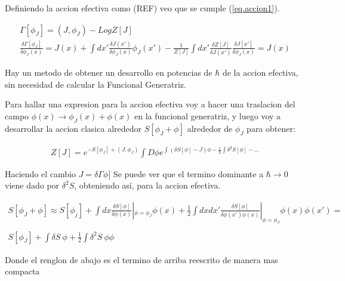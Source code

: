 Definiendo la accion efectiva como (REF) veo que se cumple (\ref{eq.accion1}).

\begin{equation}
\begin{array}{c}
\Gamma [\phi _J] = (J, \phi _J) - Log Z [J] \\
\frac{\delta \Gamma [ \phi _J ]}{\delta \phi _J (x) } = 
J(x) + \int dx ' \frac{\delta J (x')}{\delta \phi _J (x) } \phi _J (x') - 
\frac{1}{Z[J]} \int dx' \frac{\delta Z[J] }{\delta J(x')} \frac{\delta J[x']}{\delta \phi _J (x)} = J(x)
\end{array}
\end{equation}

Hay un metodo de obtener un desarrollo en potencias de $\hbar$ de la accion efectiva, sin necesidad de calcular la Funcional Generatriz.


Para hallar una expresion para la accion efectiva voy a hacer una traslacion del campo $\phi (x) \rightarrow \phi _{J} (x) + \phi (x) $ en la funcional generatriz, y luego voy a desarrollar la accion clasica alrededor  $ S[ \phi _J + \phi ] $ alrededor de $ \phi _J $ para obtener:

\begin{equation}
\begin{array}{c}
Z[J] = e ^{-S[ \phi _J ] + (J, \phi _J )} 
\int D \phi e ^{ \int (\delta S [\phi] - J) \phi - \frac{1}{2} \int \delta ^2 S[\phi ] - ... }
\end{array}
\end{equation}

Haciendo el cambio $J = \delta \Gamma \phi]$ Se puede ver que el termino dominante a $\hbar \rightarrow 0$ viene dado por $\delta ^2 S$, obteniendo así, para la accion efectiva.




\begin{equation}
\begin{array}{c}
S [\phi _J + \phi ] \approx
S[ \phi _j ] +
\int dx \frac{\delta S[\phi]}{\delta \phi (x) } | _ {\phi = \phi _J} \phi( x ) +
\frac{1}{2}
\int dx dx' \frac{\delta S[\phi]}{\delta \phi (x') \phi (x) } | _ {\phi = \phi _J} \phi( x ) \phi (x') = \\ \\
S[ \phi _J ] + \int \delta S \ \phi + \frac{1}{2} \int \delta ^2 S \ \phi \phi
\end{array}
\end{equation}

Donde el renglon de abajo es el termino de arriba reescrito de manera mas compacta


